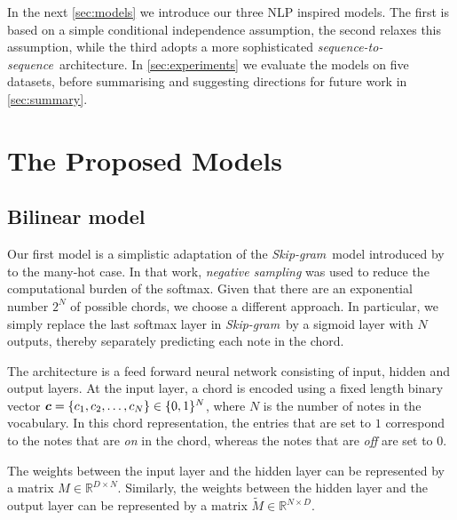 \documentclass{article}
\newcommand{\R}{\mathbb{R}}
\newcommand{\M}{\tilde{M}}
\newcommand{\boldc}{\boldsymbol c}
\newcommand{\skipgram}{\textit{Skip-gram}}
\newcommand{\seqtoseq}{\textit{sequence-to-sequence}}
\begin{document}
In the next \autoref{sec:models} we introduce our three NLP inspired models. The first is based on a simple conditional independence assumption, the second relaxes this assumption, while the third adopts a more sophisticated \seqtoseq\ architecture. In \autoref{sec:experiments} we evaluate the models on five datasets, before summarising and suggesting directions for future work in \autoref{sec:summary}. 

\section{The Proposed Models}
\label{sec:models}
\subsection{Bilinear model}
Our first model is a simplistic adaptation of the \skipgram\ model introduced by \citet{mik2013} to the many-hot case. In that work, \textit{negative sampling} was used to reduce the computational burden of the softmax. Given that there are an exponential number $2^N$ of possible chords, we choose a different approach. In particular, we simply replace the last softmax layer in \skipgram\ by a sigmoid layer with $N$ outputs, thereby separately predicting each note in the chord.  

The architecture is a feed forward neural network consisting of input, hidden and output layers. At the input layer, a chord is encoded using a fixed length binary vector $\nolinebreak{\boldc = \{c_1, c_2, \ldots, c_N\}\in \{0,1\}^N}$, where $N$ is the number of notes in the vocabulary. In this chord representation, the entries that are set to $1$ correspond to the notes that are \textit{on} in the chord, whereas the notes that are \textit{off} are set to $0$. 

The weights between the input layer and the hidden layer can be represented by a matrix $M\in \R^{D \times N}$. Similarly, the weights between the hidden layer and the output layer can be represented by a matrix $\M\in \R^{N \times D}$. 
\end{document}
